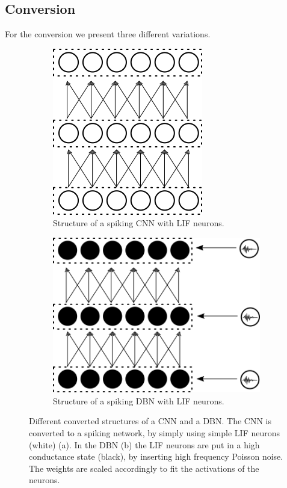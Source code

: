 \subsection{Conversion} \label{c:conversionappr}

For the conversion we present three different variations.

\begin{figure}
	\centering
	\begin{subfigure}[t]{.5\textwidth}
  		\centering
  		\includegraphics[width=.54\linewidth]{imgs/convert_cnn.png}
  		\caption{Structure of a spiking CNN with LIF neurons.}
  		\label{fig:converted1}
	\end{subfigure}%
	\begin{subfigure}[t]{.5\textwidth}
  		\centering
  		\includegraphics[width=.8\linewidth]{imgs/convert_dbn.png}
  		\caption{Structure of a spiking DBN with LIF neurons.}
  		\label{fig:converted2}
  	\end{subfigure}
	\caption[Different converted structures of a CNN and a DBN.]{Different converted structures of a CNN and a DBN. The CNN is converted to a spiking network, by simply using simple LIF neurons (white) (a). In the DBN (b) the LIF neurons are put in a high conductance state (black), by inserting high frequency Poisson noise. The weights are scaled accordingly to fit the activations of the neurons.}
	\label{fig:converted}
\end{figure}


